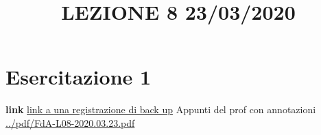\section{Esercitazione 1}
\title{LEZIONE 8 23/03/2020}\newline
\textbf{link} \href{https://onedrive.live.com/?authkey=%21AATVJK3srNwxGzs&id=EE092FF4FF7B5B0E%212158&cid=EE092FF4FF7B5B0E}{link a una registrazione di back up}\newline
\newline
Appunti del prof con annotazioni \url{../pdf/FdA-L08-2020.03.23.pdf}